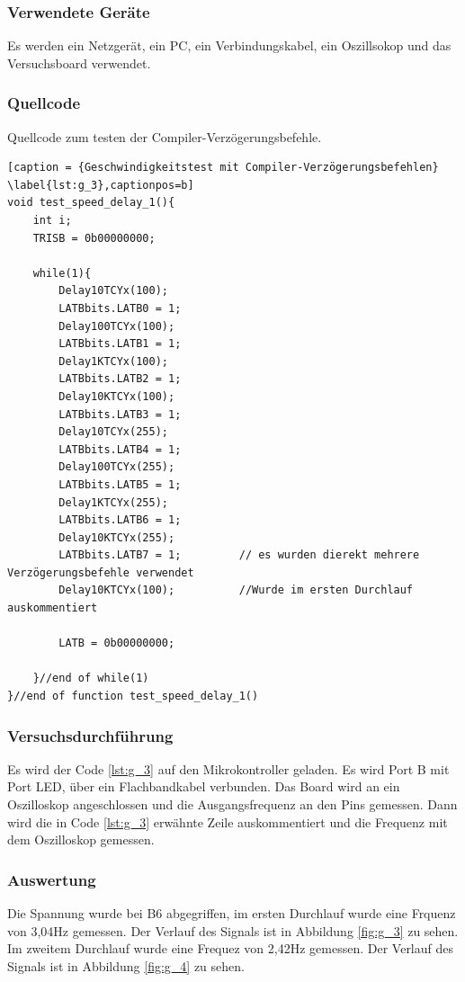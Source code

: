 \documentclass[12pt,a4paper]{article}
\begin{document}
\subsubsection*{Verwendete Geräte}

Es werden ein Netzgerät, ein PC, ein Verbindungskabel, ein Oszillsokop und das Versuchsboard verwendet.

\subsubsection*{Quellcode}

Quellcode zum testen der Compiler-Verzögerungsbefehle.

\lstset{language=C, basicstyle=\tiny}
\begin{lstlisting}[caption = {Geschwindigkeitstest mit Compiler-Verzögerungsbefehlen} \label{lst:g_3},captionpos=b]
void test_speed_delay_1(){
	int i;
	TRISB = 0b00000000;
	
	while(1){
		Delay10TCYx(100);
		LATBbits.LATB0 = 1;
		Delay100TCYx(100);
		LATBbits.LATB1 = 1;
		Delay1KTCYx(100);
		LATBbits.LATB2 = 1;
		Delay10KTCYx(100);
		LATBbits.LATB3 = 1;
		Delay10TCYx(255);
		LATBbits.LATB4 = 1;
		Delay100TCYx(255);
		LATBbits.LATB5 = 1;
		Delay1KTCYx(255);
		LATBbits.LATB6 = 1;
		Delay10KTCYx(255);
		LATBbits.LATB7 = 1;			// es wurden dierekt mehrere Verzögerungsbefehle verwendet
		Delay10KTCYx(100);			//Wurde im ersten Durchlauf auskommentiert
		
		LATB = 0b00000000;
		
	}//end of while(1)
}//end of function test_speed_delay_1()
\end{lstlisting}


\subsubsection*{Versuchsdurchführung}

Es wird der Code \ref{lst:g_3} auf den Mikrokontroller geladen. Es wird Port B mit Port LED, über ein Flachbandkabel verbunden. Das Board wird an ein Oszilloskop angeschlossen und die Ausgangsfrequenz an den Pins gemessen. Dann wird die in Code \ref{lst:g_3} erwähnte Zeile auskommentiert und die Frequenz mit dem  Oszilloskop gemessen.


\subsubsection*{Auswertung}

Die Spannung wurde bei B6 abgegriffen, im ersten Durchlauf wurde eine Frquenz von 3,04Hz gemessen. Der Verlauf des Signals ist in Abbildung \ref{fig:g_3} zu sehen. Im zweitem Durchlauf wurde eine Frequez von 2,42Hz gemessen. Der Verlauf des Signals ist in Abbildung \ref{fig:g_4} zu sehen.
\end{document}
